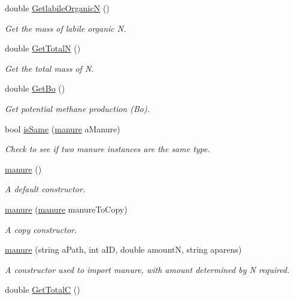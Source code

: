 \begin{DoxyCompactItemize}
double \mbox{\hyperlink{classmanure_a0bbdefcebb7c190928cb33020f90bd39}{Getlabile\+OrganicN}} ()
\begin{DoxyCompactList}\small\item\em Get the mass of labile organic N. \end{DoxyCompactList}\item 
double \mbox{\hyperlink{classmanure_a5a3323a38ff8bf4e8f45bcf7fd22f47c}{Get\+TotalN}} ()
\begin{DoxyCompactList}\small\item\em Get the total mass of N. \end{DoxyCompactList}\item 
double \mbox{\hyperlink{classmanure_ab7c3b9e8a727966f4d99548a98ae6f2a}{Get\+Bo}} ()
\begin{DoxyCompactList}\small\item\em Get potential methane production (Bo). \end{DoxyCompactList}\item 
bool \mbox{\hyperlink{classmanure_a4d39a3bf380840fb4295100fa9a476ec}{is\+Same}} (\mbox{\hyperlink{classmanure}{manure}} a\+Manure)
\begin{DoxyCompactList}\small\item\em Check to see if two manure instances are the same type. \end{DoxyCompactList}\item 
\mbox{\hyperlink{classmanure_af94ebfdf6ee55df1bf6fa835c2318ae3}{manure}} ()
\begin{DoxyCompactList}\small\item\em A default constructor. \end{DoxyCompactList}\item 
\mbox{\hyperlink{classmanure_a38ddb577591d36f8bd5e4c7d8fed6d51}{manure}} (\mbox{\hyperlink{classmanure}{manure}} manure\+To\+Copy)
\begin{DoxyCompactList}\small\item\em A copy constructor. \end{DoxyCompactList}\item 
\mbox{\hyperlink{classmanure_afb980a45746d9065d8c76ff38e55970a}{manure}} (string a\+Path, int a\+ID, double amountN, string aparens)
\begin{DoxyCompactList}\small\item\em A constructor used to import manure, with amount determined by N required. \end{DoxyCompactList}\item 
double \mbox{\hyperlink{classmanure_aa6535fb2bef7c1d0b4462e61bb699718}{Get\+TotalC}} ()

\end{DoxyCompactItemize}
